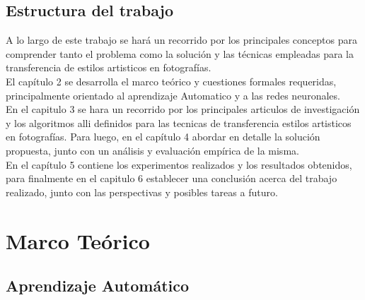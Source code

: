 \documentclass[a4paper,11pt,spanish]{book}
\begin{document}
  \section {Estructura del trabajo}
    A lo largo de este trabajo se hará un recorrido por los principales conceptos para comprender tanto el problema como la solución y las técnicas empleadas para la transferencia
    de estilos artisticos en fotografías.\\
    El capítulo 2 se desarrolla el marco teórico y cuestiones formales requeridas, principalmente orientado al aprendizaje Automatico y a las redes neuronales.\\
    En el capitulo 3 se hara un recorrido por los principales articulos de investigación y los algoritmos alli definidos para las tecnicas de transferencia estilos artisticos en fotografías.
    Para luego, en el capítulo 4 abordar en detalle la solución propuesta, junto con un análisis y evaluación empírica de la misma.\\
    En el capítulo 5 contiene los experimentos realizados y los resultados obtenidos, para finalmente en el capitulo 6 establecer una conclusión acerca del trabajo realizado,
    junto con las perspectivas y posibles tareas a futuro.\\

\chapter{Marco Teórico}




  \section{Aprendizaje Automático}
\end{document}
